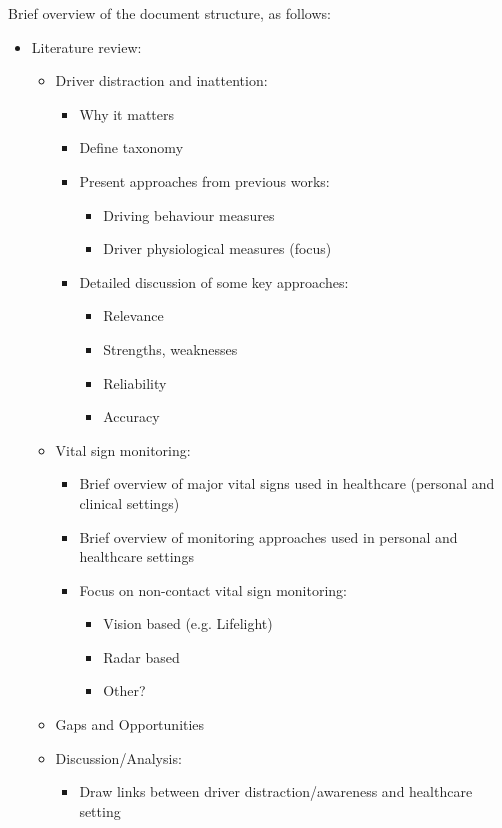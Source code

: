 \documentclass[11pt, parskip=half*,twoside=false]{scrbook}
\begin{document}
Brief overview of the document structure, as follows:
\begin{itemize}
	\item Literature review:
	\begin{itemize}
		\item Driver distraction and inattention:
		\begin{itemize}
			\item Why it matters
			\item Define taxonomy
			\item Present approaches from previous works:
			\begin{itemize}
				\item Driving behaviour measures
				\item Driver physiological measures (focus)
			\end{itemize}
			\item Detailed discussion of some key approaches:
			\begin{itemize}
				\item Relevance
				\item Strengths, weaknesses
				\item Reliability
				\item Accuracy
			\end{itemize}
		\end{itemize}
		\item Vital sign monitoring:
		\begin{itemize}
			\item Brief overview of major vital signs used in healthcare (personal and clinical settings)
			\item Brief overview of monitoring approaches used in personal and healthcare settings
			\item Focus on non-contact vital sign monitoring:
			\begin{itemize}
				\item Vision based (e.g. Lifelight)
				\item Radar based
				\item Other?
			\end{itemize}
		\end{itemize}
		\item Gaps and Opportunities
		\item Discussion/Analysis:
			\begin{itemize}
				\item Draw links between driver distraction/awareness and healthcare setting

\end{itemize}
\end{itemize}
\end{itemize}
\end{document}

